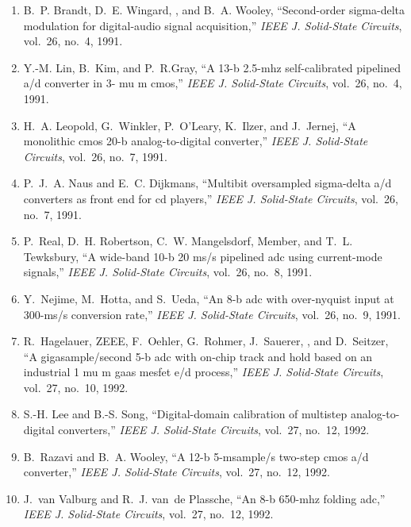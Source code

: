 \begin{enumerate}
\item
B.~P. Brandt, D.~E. Wingard, , and B.~A. Wooley, ``Second-order sigma-delta
  modulation for digital-audio signal acquisition,'' \emph{{IEEE} J.
  Solid-State Circuits}, vol.~26, no.~4, 1991.

\item
Y.-M. Lin, B.~Kim, and P.~R.Gray, ``A 13-b 2.5-mhz self-calibrated pipelined
  a/d converter in 3- mu m cmos,'' \emph{{IEEE} J. Solid-State Circuits},
  vol.~26, no.~4, 1991.

\item
H.~A. Leopold, G.~Winkler, P.~O’Leary, K.~Ilzer, and J.~Jernej, ``A
  monolithic cmos 20-b analog-to-digital converter,'' \emph{{IEEE} J.
  Solid-State Circuits}, vol.~26, no.~7, 1991.

\item
P.~J.~A. Naus and E.~C. Dijkmans, ``Multibit oversampled sigma-delta a/d
  converters as front end for cd players,'' \emph{{IEEE} J. Solid-State
  Circuits}, vol.~26, no.~7, 1991.

\item
P.~Real, D.~H. Robertson, C.~W. Mangelsdorf, Member, and T.~L. Tewksbury, ``A
  wide-band 10-b 20 ms/s pipelined adc using current-mode signals,''
  \emph{{IEEE} J. Solid-State Circuits}, vol.~26, no.~8, 1991.

\item
Y.~Nejime, M.~Hotta, and S.~Ueda, ``An 8-b adc with over-nyquist input at
  300-ms/s conversion rate,'' \emph{{IEEE} J. Solid-State Circuits}, vol.~26,
  no.~9, 1991.

\item
R.~Hagelauer, ZEEE, F.~Oehler, G.~Rohmer, J.~Sauerer, , and D.~Seitzer, ``A
  gigasample/second 5-b adc with on-chip track and hold based on an industrial
  1 mu m gaas mesfet e/d process,'' \emph{{IEEE} J. Solid-State Circuits},
  vol.~27, no.~10, 1992.

\item
S.-H. Lee and B.-S. Song, ``Digital-domain calibration of multistep
  analog-to-digital converters,'' \emph{{IEEE} J. Solid-State Circuits},
  vol.~27, no.~12, 1992.

\item
B.~Razavi and B.~A. Wooley, ``A 12-b 5-msample/s two-step cmos a/d converter,''
  \emph{{IEEE} J. Solid-State Circuits}, vol.~27, no.~12, 1992.

\item
J.~van Valburg and R.~J. van~de Plassche, ``An 8-b 650-mhz folding adc,''
  \emph{{IEEE} J. Solid-State Circuits}, vol.~27, no.~12, 1992.


\end{enumerate}
